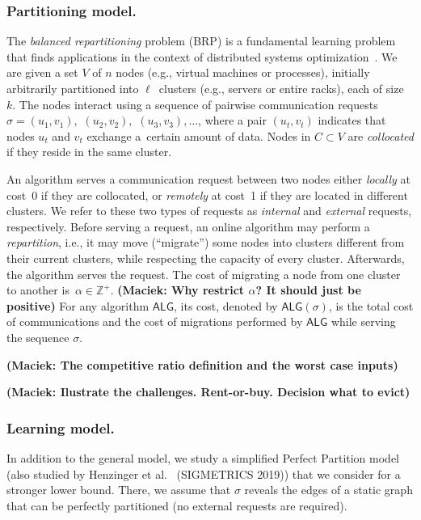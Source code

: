 \documentclass[manuscript,screen=true, review, anonymous]{acmart}
\newcommand{\ALG}{\textsf{ALG}\xspace}
\newcommand{\OBRP}{BRP}
\newcommand\maciek[1]{\color{brown}\textbf{(Maciek: #1)}\color{black}}
\begin{document}
\subsubsection{Partitioning model.}
The \emph{balanced repartitioning} problem (\OBRP{})
is a fundamental learning problem
that finds applications in the context of
distributed systems optimization~\cite{repartition-disc}. We are given a set $V$ of $n$ nodes 
(e.g., virtual machines or processes),
initially arbitrarily partitioned into $\ell$~clusters
(e.g., servers or entire racks),
each of size~$k$.
The nodes interact using
a sequence of pairwise communication requests
$\sigma = (u_1,v_1),$ $(u_2,v_2),$ $(u_3,v_3), \ldots$,
where a pair $(u_t,v_t)$ indicates that nodes $u_t$ and $v_t$ exchange a~certain amount of data.
Nodes in $C \subset V$ are \emph{collocated}
if they reside in the same cluster.

An algorithm serves a communication request between two nodes
either \emph{locally} at cost~0
if they are collocated,
or \emph{remotely} at cost~1
if they are located in different clusters.
We refer to these two types of requests as \emph{internal}
and \emph{external} requests, respectively.
Before serving a request,
an online algorithm may perform a \emph{repartition},
i.e.,
it may move (``migrate'') some nodes into clusters different from their current clusters, while respecting the capacity of every cluster. 
Afterwards, 
the algorithm serves the  request.
The cost of migrating a node from one cluster to another
is~$\alpha \in \mathbb{Z}^+$.
\maciek{Why restrict $\alpha$? It should just be positive}
For any algorithm $\ALG$,
its cost,
denoted by $\ALG(\sigma)$,
is the total cost of communications and
the cost of migrations performed by $\ALG$ while serving the sequence $\sigma$.

\maciek{The competitive ratio definition and the worst case inputs}

\maciek{Ilustrate the challenges. Rent-or-buy. Decision what to evict}


\subsubsection{Learning model.}
In addition to the general model, we study a simplified Perfect Partition model (also studied by Henzinger et al.~\cite{sigmetrics19_partitioning} (SIGMETRICS 2019)) that we consider for a stronger lower bound.
There, we assume that $\sigma$
reveals the edges of a static graph
that can be perfectly partitioned
(no external requests are required). 
\end{document}
